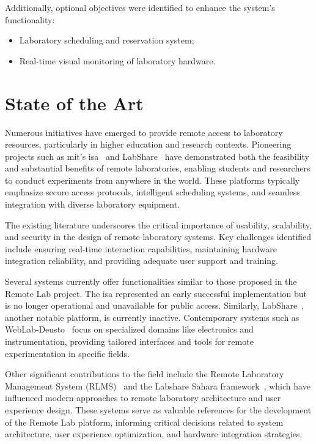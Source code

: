 Additionally, optional objectives were identified to enhance the system's functionality:
\begin{itemize}
\item Laboratory scheduling and reservation system;
\item Real-time visual monitoring of laboratory hardware.
\end{itemize}

\section{State of the Art}\label{sec:state_of_art}
Numerous initiatives have emerged to provide remote access to laboratory resources, particularly in higher education and research contexts. Pioneering projects such as \acs{mit}'s \ac{isa}~\cite{ilab} and LabShare~\cite{labshare} have demonstrated both the feasibility and substantial benefits of remote laboratories, enabling students and researchers to conduct experiments from anywhere in the world. These platforms typically emphasize secure access protocols, intelligent scheduling systems, and seamless integration with diverse laboratory equipment.

The existing literature underscores the critical importance of usability, scalability, and security in the design of remote laboratory systems. Key challenges identified include ensuring real-time interaction capabilities, maintaining hardware integration reliability, and providing adequate user support and training.

Several systems currently offer functionalities similar to those proposed in the Remote Lab project. The \acs{isa} represented an early successful implementation but is no longer operational and unavailable for public access. Similarly, LabShare~\cite{labshare}, another notable platform, is currently inactive. Contemporary systems such as WebLab-Deusto~\cite{weblabdeusto} focus on specialized domains like electronics and instrumentation, providing tailored interfaces and tools for remote experimentation in specific fields.

Other significant contributions to the field include the Remote Laboratory Management System (RLMS)~\cite{rlms} and the Labshare Sahara framework~\cite{sahara}, which have influenced modern approaches to remote laboratory architecture and user experience design. These systems serve as valuable references for the development of the Remote Lab platform, informing critical decisions related to system architecture, user experience optimization, and hardware integration strategies.

